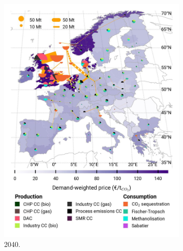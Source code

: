 \documentclass[preprint,12pt,sort&compress]{elsarticle}
\begin{document}
\begin{figure}[htbp]
\begin{subfigure}[t]{0.33\textwidth}
      \includegraphics[width=1\textwidth]{maps/pcipmi-national-expansion/base_s_adm___2040-balance_map_co2_stored} 
      \caption{ 2040.}
      \label{fig:PCI-n_lt_2040_co2}
  \end{subfigure}
  \begin{subfigure}[t]{0.33\textwidth}
      \vspace{0pt}

\end{subfigure}
\end{figure}
\end{document}
